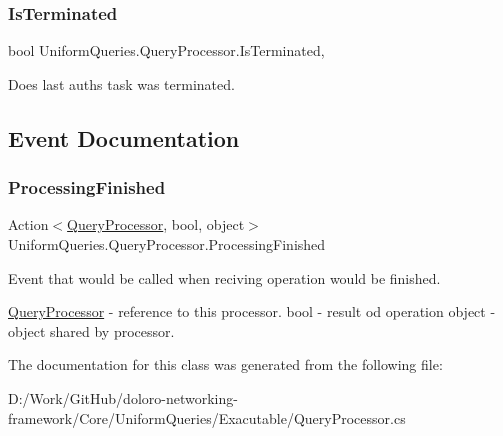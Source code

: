 \mbox{\label{class_uniform_queries_1_1_query_processor_a6c7b2f71bee989944cb95f927ed3bdfd}} 
\subsubsection{\texorpdfstring{Is\+Terminated}{IsTerminated}}
{\footnotesize\ttfamily bool Uniform\+Queries.\+Query\+Processor.\+Is\+Terminated\hspace{0.3cm}{\ttfamily [get]}, {}}



Does last auth\textquotesingle{}s task was terminated. 



\subsection{Event Documentation}
\mbox{\label{class_uniform_queries_1_1_query_processor_a6892127a6d09754370570c124a2a5452}} 
\subsubsection{\texorpdfstring{Processing\+Finished}{ProcessingFinished}}
{\footnotesize\ttfamily Action$<$\mbox{\hyperlink{class_uniform_queries_1_1_query_processor}{Query\+Processor}}, bool, object$>$ Uniform\+Queries.\+Query\+Processor.\+Processing\+Finished}



Event that would be called when reciving operation would be finished. 

\mbox{\hyperlink{class_uniform_queries_1_1_query_processor}{Query\+Processor}} -\/ reference to this processor. bool -\/ result od operation object -\/ object shared by processor. 

The documentation for this class was generated from the following file\+:\begin{DoxyCompactItemize}
\item 
D\+:/\+Work/\+Git\+Hub/doloro-\/networking-\/framework/\+Core/\+Uniform\+Queries/\+Exacutable/Query\+Processor.\+cs\end{DoxyCompactItemize}
